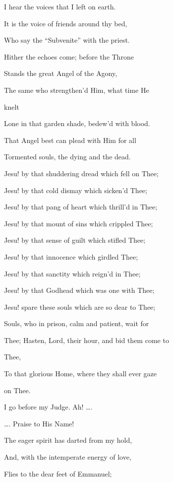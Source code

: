 
I hear the voices that I left on earth.


It is the voice of friends around thy bed,

Who say the ``Subvenite'' with the priest.

Hither the echoes come; before the Throne

Stands the great Angel of the Agony,

The same who strengthen'd Him, what time He

knelt

Lone in that garden shade, bedew'd with blood.

That Angel best can plead with Him for all

Tormented souls, the dying and the dead.


Jesu! by that shuddering dread which fell on Thee;

Jesu! by that cold dismay which sicken'd Thee;

Jesu! by that pang of heart which thrill'd in Thee;

Jesu! by that mount of sins which crippled Thee;

Jesu! by that sense of guilt which stifled Thee;

Jesu! by that innocence which girdled Thee;

Jesu! by that sanctity which reign'd in Thee;

Jesu! by that Godhead which was one with Thee;

Jesu! spare these souls which are so dear to Thee;

Souls, who in prison, calm and patient, wait for

Thee; Hasten, Lord, their hour, and bid them come to

Thee,

To that glorious Home, where they shall ever gaze

on Thee.


I go before my Judge. Ah! ….


…. Praise to His Name!

The eager spirit has darted from my hold,

And, with the intemperate energy of love,

Flies to the dear feet of Emmanuel;

